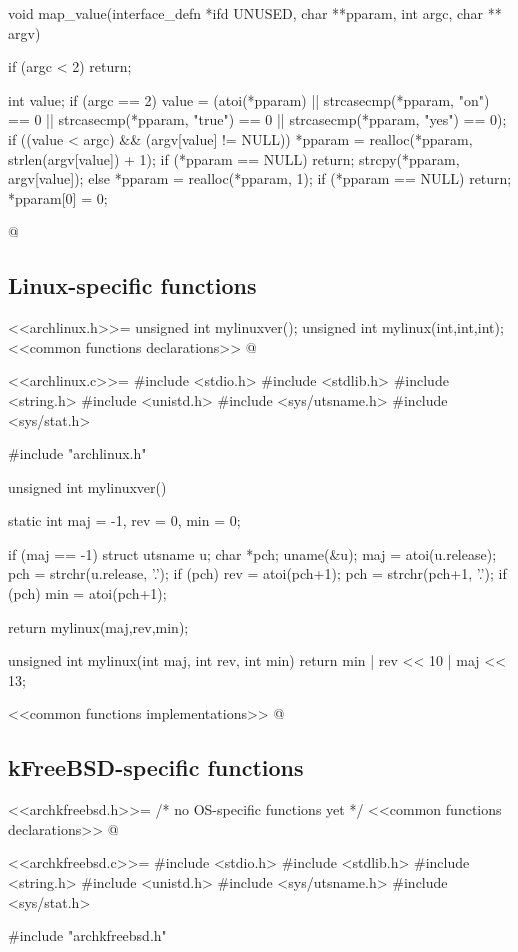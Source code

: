 \documentclass{article}
\begin{document}
void map_value(interface_defn *ifd UNUSED, char **pparam, int argc, char ** argv)
{
	if (argc < 2) return;

	int value;
	if (argc == 2) {
		value = (atoi(*pparam) ||
			strcasecmp(*pparam, "on") == 0 ||
			strcasecmp(*pparam, "true") == 0 ||
			strcasecmp(*pparam, "yes") == 0);
	}
	if ((value < argc) && (argv[value] != NULL)) {
		*pparam = realloc(*pparam, strlen(argv[value]) + 1);
		if (*pparam == NULL) return;
		strcpy(*pparam, argv[value]);
	} else {
		*pparam = realloc(*pparam, 1);
		if (*pparam == NULL) return;
		*pparam[0] = 0;
	}
}

@ 

\subsection{Linux-specific functions}

<<archlinux.h>>=
unsigned int mylinuxver();
unsigned int mylinux(int,int,int);
<<common functions declarations>>
@

<<archlinux.c>>=
#include <stdio.h>
#include <stdlib.h>
#include <string.h>
#include <unistd.h>
#include <sys/utsname.h>
#include <sys/stat.h>

#include "archlinux.h"

unsigned int mylinuxver() {
	static int maj = -1, rev = 0, min = 0;

	if (maj == -1) {
		struct utsname u;
		char *pch;
		uname(&u);
		maj = atoi(u.release);
		pch = strchr(u.release, '.');
		if (pch) {
			rev = atoi(pch+1);
			pch = strchr(pch+1, '.');
			if (pch) {
				min = atoi(pch+1);
			}
		}
	}

	return mylinux(maj,rev,min);
}

unsigned int mylinux(int maj, int rev, int min) { 
	return min | rev << 10 | maj << 13;
}

<<common functions implementations>>
@ 

\subsection{kFreeBSD-specific functions}

<<archkfreebsd.h>>=
/* no OS-specific functions yet */
<<common functions declarations>>
@

<<archkfreebsd.c>>=
#include <stdio.h>
#include <stdlib.h>
#include <string.h>
#include <unistd.h>
#include <sys/utsname.h>
#include <sys/stat.h>

#include "archkfreebsd.h"
\end{document}
